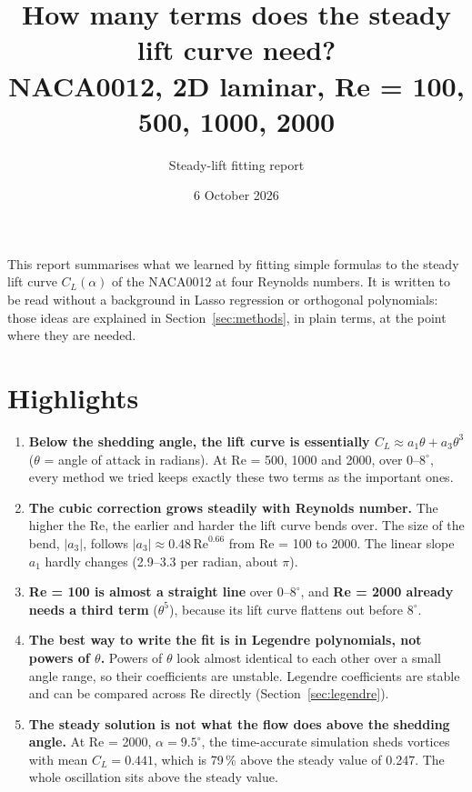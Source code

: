 \documentclass[11pt,a4paper]{article}
\title{How many terms does the steady lift curve need?\\[2pt]
\large NACA0012, 2D laminar, Re = 100, 500, 1000, 2000}
\author{Steady-lift fitting report}
\date{6 October 2026}
\newcommand{\CL}{C_L}
\begin{document}
\maketitle

\noindent
This report summarises what we learned by fitting simple formulas to the steady lift
curve $\CL(\alpha)$ of the NACA0012 at four Reynolds numbers. It is written to be read
without a background in Lasso regression or orthogonal polynomials: those ideas are
explained in Section~\ref{sec:methods}, in plain terms, at the point where they are
needed.

\section{Highlights}

\begin{enumerate}[leftmargin=*]
\item \textbf{Below the shedding angle, the lift curve is essentially
  $\CL \approx a_1\theta + a_3\theta^3$} ($\theta$ = angle of attack in radians).
  At Re = 500, 1000 and 2000, over $0$--$8^\circ$, every method we tried keeps exactly
  these two terms as the important ones.

\item \textbf{The cubic correction grows steadily with Reynolds number.} The higher
  the Re, the earlier and harder the lift curve bends over. The size of the bend,
  $|a_3|$, follows $|a_3| \approx 0.48\,\mathrm{Re}^{0.66}$ from Re = 100 to 2000.
  The linear slope $a_1$ hardly changes (2.9--3.3 per radian, about $\pi$).

\item \textbf{Re = 100 is almost a straight line} over $0$--$8^\circ$, and
  \textbf{Re = 2000 already needs a third term} ($\theta^5$), because its lift curve
  flattens out before $8^\circ$.

\item \textbf{The best way to write the fit is in Legendre polynomials, not powers of
  $\theta$.} Powers of $\theta$ look almost identical to each other over a small
  angle range, so their coefficients are unstable. Legendre coefficients are stable
  and can be compared across Re directly (Section~\ref{sec:legendre}).

\item \textbf{The steady solution is not what the flow does above the shedding angle.}
  At Re = 2000, $\alpha = 9.5^\circ$, the time-accurate simulation sheds vortices with
  mean $\CL = 0.441$, which is 79\,\% above the steady value of 0.247. The whole
  oscillation sits above the steady value.
\end{enumerate}
\end{document}
